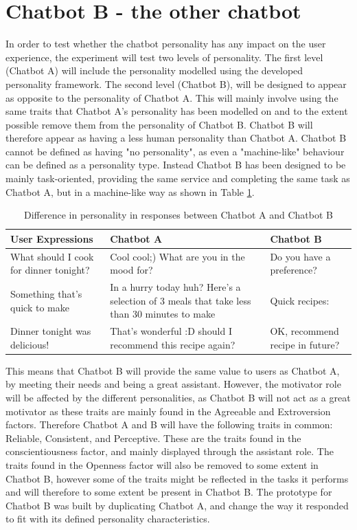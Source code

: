 \vspace{5mm}

\section{Chatbot B - the other chatbot}
In order to test whether the chatbot personality has any impact on the user experience, the experiment will test two levels of personality. The first level (Chatbot A) will include the personality modelled using the developed personality framework. The second level (Chatbot B), will be designed to appear as opposite to the personality of Chatbot A. This will mainly involve using the same traits that Chatbot A's personality has been modelled on and to the extent possible remove them from the personality of Chatbot B. Chatbot B will therefore appear as having a less human personality than Chatbot A. Chatbot B cannot be defined as having "no personality", as even a "machine-like" behaviour can be defined as a personality type. Instead Chatbot B has been designed to be mainly task-oriented, providing the same service and completing the same task as Chatbot A, but in a machine-like way as shown in Table \ref{table:3}.
    
\begin{table}[h]
\begin{tabular}{ |p{3cm}||p{5cm}||p{5cm}| }
    \hline
    User Expressions & Chatbot A & Chatbot B \\ 
    \hline
    What should I cook for dinner tonight? &    Cool cool;) What are you in the mood for?   & Do you have a preference? \\
    \hline   
    Something that's quick to make &   In a hurry today huh? Here's a selection of 3 meals that take less than 30 minutes to make  & Quick recipes: \\
    \hline
    Dinner tonight was delicious! & That's wonderful :D should I recommend this recipe again?  & OK, recommend recipe in future? \\
    \hline
\end{tabular}
\caption{Difference in personality in responses between Chatbot A and Chatbot B}
\label{table:3}
\end{table}
    
This means that Chatbot B will provide the same value to users as Chatbot A, by meeting their needs and being a great assistant. However, the motivator role will be affected by the different personalities, as Chatbot B will not act as a great motivator as these traits are mainly found in the Agreeable and Extroversion factors. Therefore Chatbot A and B will have the following traits in common: Reliable, Consistent, and Perceptive. These are the traits found in the conscientiousness factor, and mainly displayed through the assistant role. The traits found in the Openness factor will also be removed to some extent in Chatbot B, however some of the traits might be reflected in the tasks it performs and will therefore to some extent be present in Chatbot B. The prototype for Chatbot B was built by duplicating Chatbot A, and change the way it responded to fit with its defined personality characteristics.

